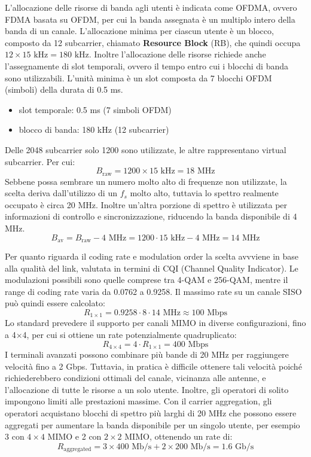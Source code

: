 L'allocazione delle risorse di banda agli utenti è indicata come OFDMA, ovvero FDMA basata su OFDM, per cui la banda assegnata è un multiplo intero della banda di un canale.
L'allocazione minima per ciascun utente è un blocco, composto da 12 subcarrier, chiamato \textbf{Resource Block} (RB), che quindi occupa $12 \times 15 \text{ kHz} = 180 \text{ kHz}$.
Inoltre l'allocazione delle risorse richiede anche l'assegnamente di slot temporali, ovvero il tempo entro cui i blocchi di banda sono utilizzabili.
L'unità minima è un slot composta da 7 blocchi OFDM (simboli) della durata di 0.5 ms.
\begin{itemize}
    \item slot temporale: 0.5 ms (7 simboli OFDM) 
    \item blocco di banda: 180 kHz (12 subcarrier)
\end{itemize}
Delle 2048 subcarrier solo 1200 sono utilizzate, le altre rappresentano virtual subcarrier. Per cui:
\[
    B_{\text{raw}} = 1200 \times 15 \text{ kHz} = 18 \text{ MHz}  
\]
Sebbene possa sembrare un numero molto alto di frequenze non utilizzate, la scelta deriva dall'utilizzo di un $f_s$ molto alto, tuttavia lo spettro realmente occupato è circa 20 MHz.
Inoltre un'altra porzione di spettro è utilizzata per informazioni di controllo e sincronizzazione, riducendo la banda disponibile di 4 MHz.
\[
    B_{\text{av}} = B_{\text{raw}} - 4 \text{ MHz} = 1200 \cdot 15 \text{ kHz} - 4 \text{ MHz} = 14 \text{ MHz}
\]

Per quanto riguarda il coding rate e modulation order la scelta avvviene in base alla qualità del link, valutata in termini di CQI (Channel Quality Indicator). Le modulazioni possibili sono quelle comprese tra 4-QAM e 256-QAM, mentre il range di coding rate varia da 0.0762 a 0.9258.
Il massimo rate su un canale SISO può quindi essere calcolato:
\[
    R_{1 \times 1} = 0.9258 \cdot 8 \cdot 14 \text{ MHz} \approx 100 \text{ Mbps}
\]
Lo standard prevedere il supporto per canali MIMO in diverse configurazioni, fino a 4$\times$4, per cui si ottiene un rate potenzialmente quadruplicato:
\[
    R_{4 \times 4} = 4 \cdot R_{1 \times 1} = 400 \text{ Mbps}
\]
I terminali avanzati possono combinare più bande di 20 MHz per raggiungere velocità fino a 2 Gbps.
Tuttavia, in pratica è difficile ottenere tali velocità poiché richiederebbero condizioni ottimali del canale, vicinanza alle antenne, e l'allocazione di tutte le risorse a un solo utente.
Inoltre, gli operatori di solito impongono limiti alle prestazioni massime. 
Con il carrier aggregation, gli operatori acquistano blocchi di spettro più larghi di 20 MHz che possono essere aggregati per aumentare la banda disponibile per un singolo utente, per esempio 3 con $4 \times 4$ MIMO e 2 con $2 \times 2$ MIMO, ottenendo un rate di:
\[
    R_{\text{aggregated}} = 3 \times 400 \text{ Mb/s} + 2 \times 200 \text{ Mb/s} = 1.6 \text{ Gb/s}
\]


